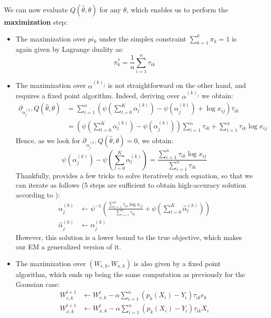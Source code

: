 We can now evaluate $Q(\widehat{\theta}, \theta)$ for any $\theta$, which enables us to perform the \textbf{maximization} step:
\begin{itemize}
    \item The maximization over $pi_k$ under the simplex constraint $\sum_{k=1}^k \pi_k = 1$ is again given by Lagrange duality as:
        $$
        \pi_k^* = \frac{1}{n} \sum_{i=1}^n \tau_{ik}
        $$
    \item The maximization over $\alpha^{(k)_j}$ is not straightforward on the other hand, and requires a fixed point algorithm.
          Indeed, deriving over $\alpha^{(k)_j}$ we obtain:
        $$
        \begin{align}
            \partial_{\alpha^{(k)}_j} Q(\widehat{\theta}, \theta) &= \sum_{i=1}^n \left(\psi \left(\sum_{l=0}^K \alpha_{l}^{(k)} \right) - \psi(\alpha_{j}^{(k)}) + \log x_{ij} \right) \tau_{ik} \\
                                                                  &= \left(\psi \left(\sum_{l=0}^K \alpha_{l}^{(k)} \right) - \psi(\alpha_{j}^{(k)})\right) \sum_{i=1}^n \tau_{ik} + \sum_{i=1}^n \tau_{ik} \log x_{ij}
        \end{align}
        $$
        Hence, as we look for $\partial_{\alpha^{(k)}_j} Q(\widehat{\theta}, \theta) = 0$, we obtain:
        $$
        \psi(\alpha_{j}^{(k)}) - \psi \left(\sum_{l=0}^K \alpha_{l}^{(k)} \right) = \frac{\sum_{i=1}^n \tau_{ik} \log x_{ij}}{\sum_{i=1}^n \tau_{ik}}
        $$
        Thankfully, \cite{dirichlet_digamma_trick} provides a few tricks to solve iteratively such equation, so that we can iterate as follows (5 steps are sufficient to obtain high-accuracy solution according to \cite{dirichlet_digamma_trick}):
        $$
        \begin{align}
            \alpha_{j}^{(k)} &\leftarrow \psi^{-1}\left(\frac{\sum_{i=1}^n \tau_{ik} \log x_{ij}}{\sum_{i=1}^n \tau_{ik}} + \psi \left(\sum_{l=0}^K \hat{\alpha}_l^{(k)} \right)  \right) \\
            \hat{\alpha}_j^{(k)} &\leftarrow \alpha_{j}^{(k)}
        \end{align}
        $$
        However, this solution is a lower bound to the true objective, which makes our EM a generalized version of it.
    \item The maximization over $(W_{e,k}, W_{x,k})$ is also given by a fixed point algorithm, which ends up being the same computation as previously for the Gaussian case:
        $$
        \begin{align}
            W_{e,k}^{l+1} &\leftarrow W_{e,k}^{l} - \alpha \sum_{i=1}^n (p_k(X_i) - Y_i) \tau_{ik} e_k \\
            W_{x,k}^{l+1} &\leftarrow  W_{x,k}^{l} - \alpha \sum_{i=1}^n (p_k(X_i) - Y_i) \tau_{ik} X_i
        \end{align}
        $$
\end{itemize}

